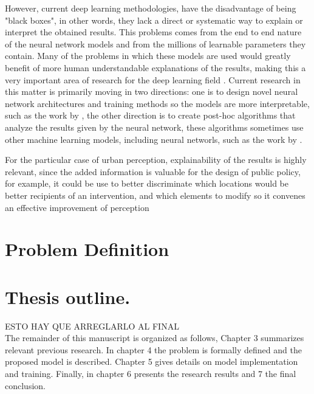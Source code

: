 However, current deep learning methodologies, have the disadvantage of being "black boxes", in other
words, they lack a direct or systematic way to explain or interpret the obtained results. This problems
comes from the end to end nature of the neural network models and from the millions of learnable parameters
they contain. Many of the problems in which these models are used would greatly benefit of more
human understandable explanations of the results, making this a very important area of
research for the deep learning field \cite{adadi_xai}.  Current research in this matter is primarily
moving in two directions: one is to design novel neural network architectures and training methods so
the models are more interpretable, such as the work by , the other
direction is to  create post-hoc algorithms \cite{adadi_xai} that analyze the results given by the
neural network, these algorithms sometimes use other machine learning models, including neural networls,
such as the work by .

For the particular case of urban perception, explainability of the results is highly relevant, since
the added information is valuable for the design of public policy, for example, it could be use to
better discriminate which locations would be better recipients of an intervention, and which elements
to modify so it convenes an effective improvement of perception

\section{Problem Definition}


\section{Thesis outline.}
ESTO HAY QUE ARREGLARLO AL FINAL \\
The remainder of this manuscript is organized as follows, Chapter 3 summarizes relevant previous research. In chapter 4
the problem is formally defined and the proposed model is described. Chapter 5 gives
details on model implementation and training. Finally, in chapter 6 presents the research results
and 7 the final conclusion.

